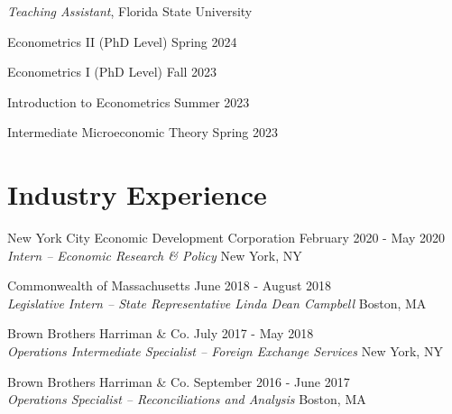 \documentclass[letterpaper]{article}
\renewenvironment{itemize}{
  \begin{list}{}{
    \setlength{\leftmargin}{1.5em}
  }
}{
  \end{list}
}
\begin{document}
\begin{itemize}

    \item \textit{Teaching Assistant}, Florida State University

    \hspace{10pt} Econometrics II (PhD Level) \hfill Spring 2024
        
    \hspace{10pt} Econometrics I (PhD Level) \hfill Fall 2023
    
    \hspace{10pt} Introduction to Econometrics  \hfill Summer 2023
    
    \hspace{10pt} Intermediate Microeconomic Theory  \hfill Spring 2023
    
\end{itemize}

\section*{Industry Experience}

\begin{itemize}

    \item New York City Economic Development Corporation \hfill February 2020 - May 2020 \\
    {\sl Intern -- Economic Research \& Policy} \hfill New York, NY

    \item Commonwealth of Massachusetts \hfill June 2018 - August 2018 \\
    {\sl Legislative Intern -- State Representative Linda Dean Campbell} \hfill Boston, MA

    \item Brown Brothers Harriman \& Co. \hfill July 2017 - May 2018 \\
    {\sl Operations Intermediate Specialist – Foreign Exchange Services} \hfill New York, NY

    \item Brown Brothers Harriman \& Co. \hfill September 2016 - June 2017 \\
    {\sl Operations Specialist – Reconciliations and Analysis} \hfill Boston, MA
\end{itemize}



\end{document}
